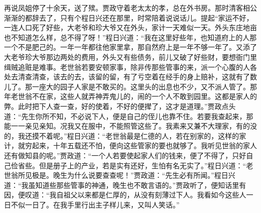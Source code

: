 \begin{parag}
    再说凤姐停了十余天，送了殡。贾政守着老太太的孝，总在外书房。那时清客相公渐渐的都辞去了，只有个程日兴还在那里，时常陪着说说话儿。提起“家运不好，一连人口死了好些，大老爷和珍大爷又在外头，家计一天难似一天。外头东庄地亩也不知道怎么样，总不得了呀！”程日兴道：“我在这里好些年，也知道府上的人那一个不是肥己的。一年一年都往他家里拿，那自然府上是一年不够一年了。又添了大老爷珍大爷那边两处的费用，外头又有些债务，前儿又破了好些财，要想衙门里缉贼追赃是难事。老世翁若要安顿家事，除非传那些管事的来，派一个心腹的人各处去清查清查，该去的去，该留的留，有了亏空着在经手的身上赔补，这就有了数儿了。那一座大的园子人家是不敢买的。这里头的出息也不少，又不派人管了。那年老世翁不在家，这些人就弄神弄鬼儿的，闹的一个人不敢到园里。这都是家人的弊。此时把下人查一查，好的使着，不好的便撵了，这才是道理。”贾政点头道：“先生你所不知，不必说下人，便是自己的侄儿也靠不住。若要我查起来，那能一一亲见亲知。况我又在服中，不能照管这些了。我素来又兼不大理家，有的没的，我还摸不着呢。”程日兴道：“老世翁最是仁德的人，若在别家的，这样的家计，就穷起来，十年五载还不怕，便向这些管家的要也就够了。我听见世翁的家人还有做知县的呢。”贾政道：“一个人若要使起家人们的钱来，便了不得了，只好自己俭省些。但是册子上的产业，若是实有还好，生怕有名无实了。”程日兴道：“老世翁所见极是。晚生为什么说要查查呢！”贾政道：“先生必有所闻。”程日兴道：“我虽知道些那些管事的神通，晚生也不敢言语的。”贾政听了，便知话里有因，便叹道：“我自祖父以来都是仁厚的，从没有刻薄过下人。我看如今这些人一日不似一日了。在我手里行出主子样儿来，又叫人笑话。”
\end{parag}


